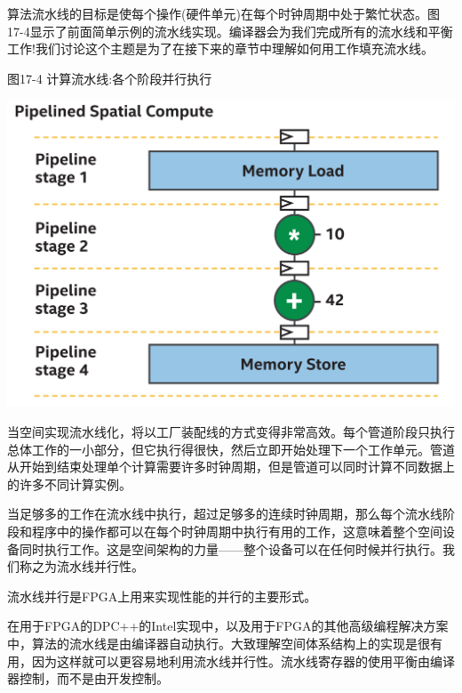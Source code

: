 算法流水线的目标是使每个操作(硬件单元)在每个时钟周期中处于繁忙状态。图17-4显示了前面简单示例的流水线实现。编译器会为我们完成所有的流水线和平衡工作!我们讨论这个主题是为了在接下来的章节中理解如何用工作填充流水线。\par

\hspace*{\fill} \par %
图17-4 计算流水线:各个阶段并行执行
\begin{center}
	\includegraphics[width=1.0\textwidth]{content/chapter-17/images/5}
\end{center}

当空间实现流水线化，将以工厂装配线的方式变得非常高效。每个管道阶段只执行总体工作的一小部分，但它执行得很快，然后立即开始处理下一个工作单元。管道从开始到结束处理单个计算需要许多时钟周期，但是管道可以同时计算不同数据上的许多不同计算实例。\par

当足够多的工作在流水线中执行，超过足够多的连续时钟周期，那么每个流水线阶段和程序中的操作都可以在每个时钟周期中执行有用的工作，这意味着整个空间设备同时执行工作。这是空间架构的力量——整个设备可以在任何时候并行执行。我们称之为流水线并行性。\par

\begin{tcolorbox}[colback=red!5!white,colframe=red!75!black]
流水线并行是FPGA上用来实现性能的并行的主要形式。
\end{tcolorbox}

\begin{tcolorbox}[colback=blue!5!white,colframe=blue!75!black, title=自动型流水线]
在用于FPGA的DPC++的Intel实现中，以及用于FPGA的其他高级编程解决方案中，算法的流水线是由编译器自动执行。大致理解空间体系结构上的实现是很有用，因为这样就可以更容易地利用流水线并行性。流水线寄存器的使用平衡由编译器控制，而不是由开发控制。
\end{tcolorbox}

